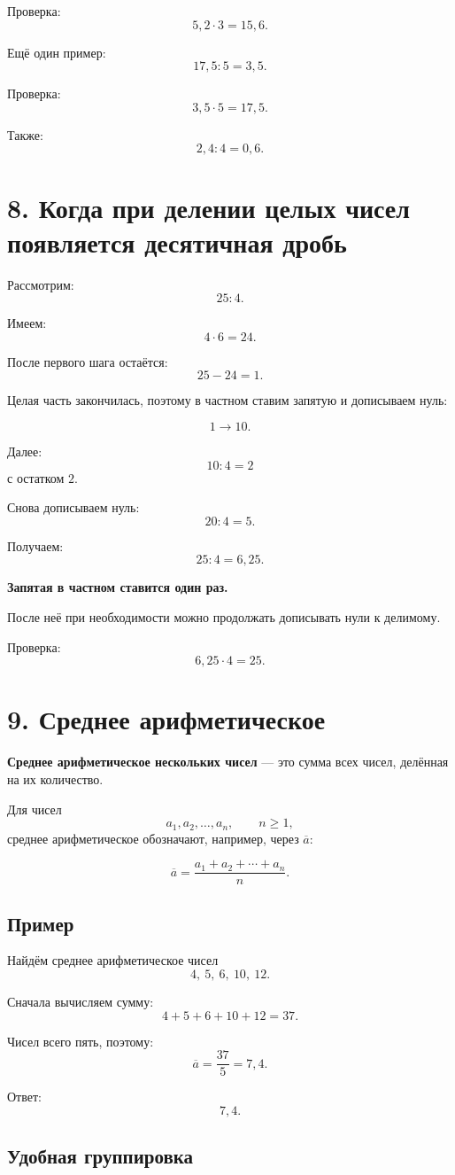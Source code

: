 \documentclass[a4paper,12pt]{article}
\newcommand{\sectiontitle}[1]{%
  \section*{\color{darkaccent}#1}%
}
\newcommand{\important}[1]{%
  \textbf{\color{darkaccent}#1}%
}
\begin{document}
Проверка:
\[
5{,}2\cdot3=15{,}6.
\]

Ещё один пример:
\[
17{,}5:5=3{,}5.
\]

Проверка:
\[
3{,}5\cdot5=17{,}5.
\]

Также:
\[
2{,}4:4=0{,}6.
\]


\sectiontitle{8. Когда при делении целых чисел появляется десятичная дробь}

Рассмотрим:
\[
25:4.
\]

Имеем:
\[
4\cdot6=24.
\]

После первого шага остаётся:
\[
25-24=1.
\]

Целая часть закончилась, поэтому в частном ставим запятую
и дописываем нуль:

\[
1\longrightarrow10.
\]

Далее:
\[
10:4=2
\]
с остатком \(2\).

Снова дописываем нуль:
\[
20:4=5.
\]

Получаем:
\[
\boxed{25:4=6{,}25}.
\]

\important{Запятая в частном ставится один раз.}
После неё при необходимости можно продолжать дописывать нули
к делимому.

Проверка:
\[
6{,}25\cdot4=25.
\]


\sectiontitle{9. Среднее арифметическое}

\important{Среднее арифметическое нескольких чисел} ---
это сумма всех чисел, делённая на их количество.

Для чисел
\[
a_1,a_2,\ldots,a_n,
\qquad n\ge1,
\]
среднее арифметическое обозначают, например, через
\(\overline a\):

\[
\boxed{
\overline a=
\frac{a_1+a_2+\cdots+a_n}{n}
}.
\]

\subsection*{\color{accent}Пример}

Найдём среднее арифметическое чисел
\[
4,\ 5,\ 6,\ 10,\ 12.
\]

Сначала вычисляем сумму:
\[
4+5+6+10+12=37.
\]

Чисел всего пять, поэтому:
\[
\overline a=\frac{37}{5}=7{,}4.
\]

Ответ:
\[
\boxed{7{,}4}.
\]

\subsection*{\color{accent}Удобная группировка}
\end{document}
